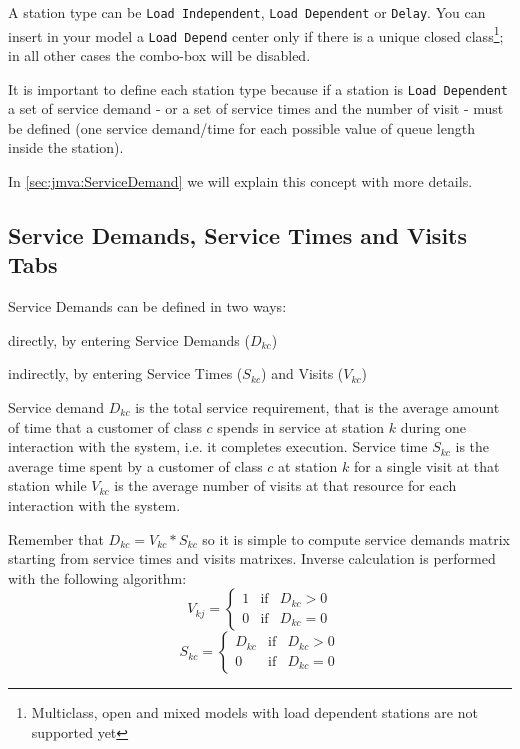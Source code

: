 A station type can be \texttt{Load Independent}, \texttt{Load
Dependent} or \texttt{Delay}. You can insert in your model a
\texttt{Load Depend} center only if there is a unique closed
class\footnote{Multiclass, open and mixed models with load dependent
stations are not supported yet}; in all other cases the combo-box
will be disabled.

It is important to define each station type because if a station is
\texttt{Load Dependent} a set of service demand - or a set of
service times and the number of visit - must be defined (one service
demand/time for each possible value of queue length inside the
station).

In \autoref{sec:jmva:ServiceDemand} we will explain this concept
with more details.

\subsection{Service Demands, Service Times and Visits Tabs}
\label{sec:jmva:ServiceDemand} Service Demands can be defined in two
ways:
\begin{itemize*}
\item directly, by entering Service Demands ($D_{kc}$)
\item indirectly, by entering Service Times ($S_{kc}$) and Visits ($V_{kc}$)
\end{itemize*}

Service demand $D_{kc}$ is the total service requirement, that is
the average amount of time that a customer of class $c$ spends in
service at station $k$ during one interaction with the system, i.e.
it completes execution. Service time $S_{kc}$ is the average time
spent by a customer of class $c$ at station $k$ for a single visit
at that station while $V_{kc}$ is the average number of visits at
that resource for each interaction with the system.

Remember that $D_{kc} = V_{kc} * S_{kc}$ so it is simple to compute
service demands matrix starting from service times and visits
matrixes. Inverse calculation is performed with the following
algorithm:
\[
V_{kj} = \left\{
\begin{array}{ccl} 1 & \textrm{if} & D_{kc} > 0 \\
0 & \textrm{if} & D_{kc} = 0 \end{array}\right.
\]
\[
S_{kc} = \left\{ \begin{array}{ccl} D_{kc} & \textrm{if} & D_{kc}
> 0 \\ 0 & \textrm{if} & D_{kc} = 0 \end{array}\right.
\]

